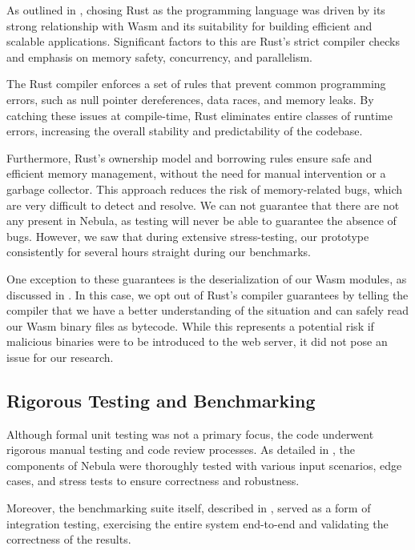 \documentclass[
  table]{report}
\begin{document}
As outlined in , chosing Rust as the programming
language was driven by its strong relationship with \ac{Wasm} and its
suitability for building efficient and scalable applications.
Significant factors to this are Rust's strict compiler checks and
emphasis on memory safety, concurrency, and parallelism.

The Rust compiler enforces a set of rules that prevent common
programming errors, such as null pointer dereferences, data races, and
memory leaks. By catching these issues at compile-time, Rust eliminates
entire classes of runtime errors, increasing the overall stability and
predictability of the codebase.

Furthermore, Rust's ownership model and borrowing rules ensure safe and
efficient memory management, without the need for manual intervention or
a garbage collector. This approach reduces the risk of memory-related
bugs, which are very difficult to detect and resolve. We can not
guarantee that there are not any present in Nebula, as testing will
never be able to guarantee the absence of bugs. However, we saw that
during extensive stress-testing, our prototype consistently for several
hours straight during our benchmarks.

One exception to these guarantees is the deserialization of our
\ac{Wasm} modules, as discussed in . In
this case, we opt out of Rust's compiler guarantees by telling the
compiler that we have a better understanding of the situation and can
safely read our \ac{Wasm} binary files as bytecode. While this
represents a potential risk if malicious binaries were to be introduced
to the web server, it did not pose an issue for our research.

\subsection{Rigorous Testing and Benchmarking}

Although formal unit testing was not a primary focus, the code underwent
rigorous manual testing and code review processes. As detailed in
, the components of Nebula were thoroughly tested
with various input scenarios, edge cases, and stress tests to ensure
correctness and robustness.

Moreover, the benchmarking suite itself, described in
, served as a form of integration testing,
exercising the entire system end-to-end and validating the correctness
of the results.
\end{document}
